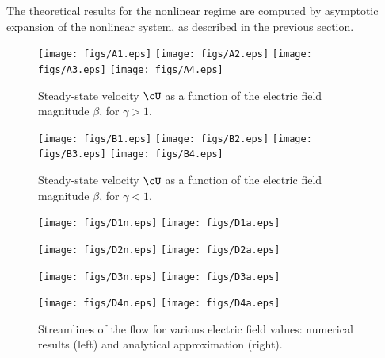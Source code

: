The theoretical results for the nonlinear regime are computed by asymptotic expansion of the
nonlinear system, as described in the previous section.
\begin{figure}[htbp]
\begin{framed}
    \begin{center}
        \texttt{[image: figs/A1.eps]}
        \texttt{[image: figs/A2.eps]}
        \texttt{[image: figs/A3.eps]}
        \texttt{[image: figs/A4.eps]}
        \caption{Steady-state velocity $\cU$ as a function of the electric field magnitude $\beta$, 
        for $\gamma > 1$.}
        \label{fig:NumResA}
    \end{center}
\end{framed}
\end{figure}
\begin{figure}[htbp]
\begin{framed}
    \begin{center}
        \texttt{[image: figs/B1.eps]}
        \texttt{[image: figs/B2.eps]}
        \texttt{[image: figs/B3.eps]}
        \texttt{[image: figs/B4.eps]}
        \caption{Steady-state velocity $\cU$ as a function of the electric field magnitude $\beta$,
        for $\gamma < 1$.}
        \label{fig:NumResB}
    \end{center}
\end{framed}
\end{figure}
\begin{figure}[htbp]
\begin{framed}
    \begin{center}
        \texttt{[image: figs/D1n.eps]}
        \texttt{[image: figs/D1a.eps]}
        
        \texttt{[image: figs/D2n.eps]}
        \texttt{[image: figs/D2a.eps]}
        
        \texttt{[image: figs/D3n.eps]}
        \texttt{[image: figs/D3a.eps]}
        
        \texttt{[image: figs/D4n.eps]}
        \texttt{[image: figs/D4a.eps]}
        \caption{Streamlines of the flow for various electric field values: numerical results (left)
        and analytical approximation (right).}
        \label{fig:NumResC}
    \end{center}
\end{framed}
\end{figure}

